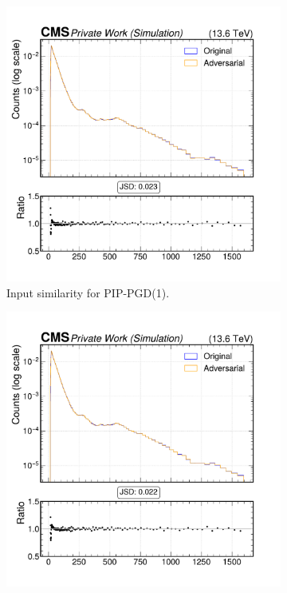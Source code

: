 \begin{figure}[h]
  \centering
  \begin{subfigure}[t]{0.32\textwidth}
    \includegraphics[width=\linewidth]{media/output/features/compare/combined_it_1/cmp_global_features_jet_pt.pdf}
    \caption*{Input similarity for PIP-PGD(1).}
  \end{subfigure}\hfill
  \begin{subfigure}[t]{0.32\textwidth}
    \includegraphics[width=\linewidth]{media/output/features/compare/combined_it_2/cmp_global_features_jet_pt.pdf}

\end{subfigure}
\end{figure}

